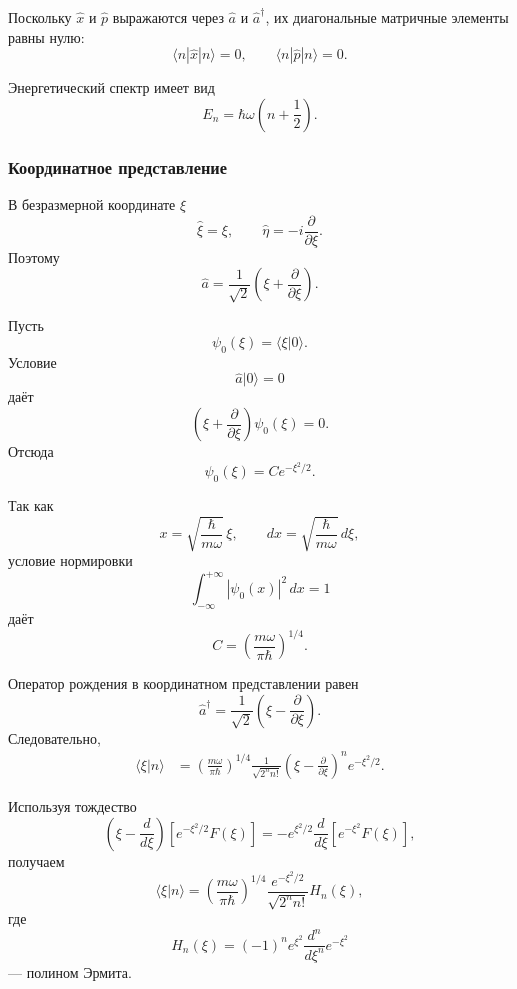 \documentclass[12pt,a4paper]{article}
\begin{document}
Поскольку $\hat x$ и $\hat p$ выражаются через $\hat a$ и
$\hat a^\dagger$, их диагональные матричные элементы равны нулю:
\[
    \boxed{
        \langle n|\hat x|n\rangle=0,
        \qquad
        \langle n|\hat p|n\rangle=0
    }.
\]

Энергетический спектр имеет вид
\[
    \boxed{
        E_n
        =
        \hbar\omega
        \left(
            n+\frac12
        \right)
    }.
\]


\subsubsection{Координатное представление}

В безразмерной координате $\xi$
\[
    \hat\xi=\xi,
    \qquad
    \hat\eta
    =
    -i\frac{\partial}{\partial\xi}.
\]
Поэтому
\[
    \hat a
    =
    \frac{1}{\sqrt2}
    \left(
        \xi+\frac{\partial}{\partial\xi}
    \right).
\]

Пусть
\[
    \psi_0(\xi)
    =
    \langle\xi|0\rangle.
\]
Условие
\[
    \hat a|0\rangle=0
\]
даёт
\[
    \left(
        \xi+\frac{\partial}{\partial\xi}
    \right)
    \psi_0(\xi)
    =
    0.
\]
Отсюда
\[
    \psi_0(\xi)
    =
    C e^{-\xi^2/2}.
\]

Так как
\[
    x
    =
    \sqrt{\frac{\hbar}{m\omega}}\,\xi,
    \qquad
    dx
    =
    \sqrt{\frac{\hbar}{m\omega}}\,d\xi,
\]
условие нормировки
\[
    \int_{-\infty}^{+\infty}
        |\psi_0(x)|^2\,dx
    =
    1
\]
даёт
\[
    \boxed{
        C
        =
        \left(
            \frac{m\omega}{\pi\hbar}
        \right)^{1/4}
    }.
\]

Оператор рождения в координатном представлении равен
\[
    \boxed{
        \hat a^\dagger
        =
        \frac{1}{\sqrt2}
        \left(
            \xi-\frac{\partial}{\partial\xi}
        \right)
    }.
\]
Следовательно,
\[
\begin{aligned}
    \langle\xi|n\rangle
    &=
    \left(
        \frac{m\omega}{\pi\hbar}
    \right)^{1/4}
    \frac{1}{\sqrt{2^n n!}}
    \left(
        \xi-\frac{\partial}{\partial\xi}
    \right)^n
    e^{-\xi^2/2}.
\end{aligned}
\]

Используя тождество
\[
    \left(
        \xi-\frac{d}{d\xi}
    \right)
    \left[
        e^{-\xi^2/2}F(\xi)
    \right]
    =
    -e^{\xi^2/2}
    \frac{d}{d\xi}
    \left[
        e^{-\xi^2}F(\xi)
    \right],
\]
получаем
\[
    \boxed{
    \langle\xi|n\rangle
    =
    \left(
        \frac{m\omega}{\pi\hbar}
    \right)^{1/4}
    \frac{e^{-\xi^2/2}}{\sqrt{2^n n!}}
    H_n(\xi)
    },
\]
где
\[
    \boxed{
        H_n(\xi)
        =
        (-1)^n
        e^{\xi^2}
        \frac{d^n}{d\xi^n}
        e^{-\xi^2}
    }
\]
--- полином Эрмита.
\end{document}
